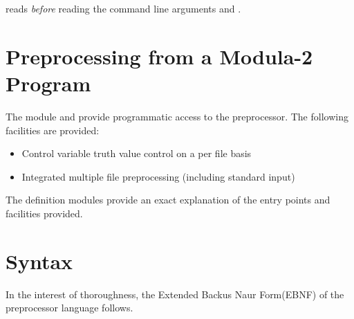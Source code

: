  reads  {\em before} reading the command line
arguments  and .

\section{Preprocessing from a Modula-2 Program}

The module  and  provide 
programmatic access to
the preprocessor.  The following facilities are provided:
\begin{itemize}
\item
    Control variable truth value control on a per file basis
\item
    Integrated multiple file preprocessing (including standard input)
\end{itemize}
The definition modules provide an exact explanation of the entry points
and facilities provided.

\section{Syntax}

In the interest of thoroughness, the Extended Backus Naur Form(EBNF)
of the preprocessor language follows.

